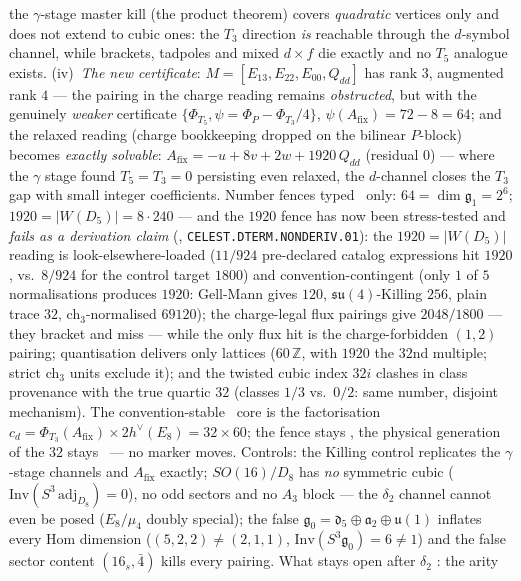 \documentclass[11pt,a4paper]{article}
\newcommand{\Z}{\mathbb Z}
\begin{document}
\begin{itemize}
\begin{itemize}
the $\gamma$-stage master kill (the product theorem) covers \emph{quadratic} vertices only and
does not extend to cubic ones: the $T_3$ direction \emph{is} reachable through the $d$-symbol
channel, while brackets, tadpoles and mixed $d{\times}f$ die exactly and no $T_5$ analogue
exists. (iv)~\emph{The new certificate}: $M=[E_{13},E_{22},E_{00},Q_{dd}]$ has rank $3$,
augmented rank $4$ --- the pairing in the charge reading remains \emph{obstructed}, but with the
genuinely \emph{weaker} certificate $\{\Phi_{T_5},\psi=\Phi_P-\Phi_{T_3}/4\}$,
$\psi(A_{\mathrm{fix}})=72-8=64$; and the relaxed reading (charge bookkeeping dropped on the
bilinear $P$-block) becomes \emph{exactly solvable}:
$A_{\mathrm{fix}}=-u+8v+2w+1920\,Q_{dd}$ (residual $0$) --- where the $\gamma$ stage found
$T_5=T_3=0$ persisting even relaxed, the $d$-channel closes the $T_3$ gap with small integer
coefficients. Number fences typed \mC\ only: $64=\dim\mathfrak g_1=2^6$;
$1920=|W(D_5)|=8\cdot240$ --- and the $1920$ fence has now been stress-tested and \emph{fails as a
derivation claim} (,
\texttt{CELEST.DTERM.NONDERIV.01}): the $1920=|W(D_5)|$ reading is look-elsewhere-loaded ($11/924$
pre-declared catalog expressions hit $1920$, vs.\ $8/924$ for the control target $1800$) and
convention-contingent (only $1$ of $5$ normalisations produces $1920$: Gell-Mann gives $120$,
$\mathfrak{su}(4)$-Killing $256$, plain trace $32$, ch$_3$-normalised $69120$); the charge-legal
flux pairings give $2048/1800$ --- they bracket and miss --- while the only flux hit is the
charge-forbidden $(1,2)$ pairing; quantisation delivers only lattices ($60\,\Z$, with $1920$ the
$32$nd multiple; strict ch$_3$ units exclude it); and the twisted cubic index $32i$ clashes in
class provenance with the true quartic $32$ (classes $1/3$ vs.\ $0/2$: same number, disjoint
mechanism). The convention-stable \mE\ core is the factorisation
$c_d=\Phi_{T_3}(A_{\mathrm{fix}})\times2h^\vee(E_8)=32\times60$; the fence stays \mC, the physical
generation of the $32$ stays \mO\ --- no marker moves.
Controls: the Killing control replicates the $\gamma$-stage channels
and $A_{\mathrm{fix}}$ exactly; $SO(16)/D_8$ has \emph{no} symmetric cubic
($\mathrm{Inv}(S^3\,\mathrm{adj}_{D_8})=0$), no odd sectors and no $A_3$ block --- the $\delta_2$
channel cannot even be posed ($E_8/\mu_4$ doubly special); the false
$\mathfrak g_0=\mathfrak d_5{\oplus}\mathfrak a_2{\oplus}\mathfrak u(1)$ inflates every Hom
dimension ($(5,2,2)\neq(2,1,1)$, $\mathrm{Inv}(S^3\mathfrak g_0)=6\neq1$) and the false sector
content $(16_s,\bar4)$ kills every pairing. What stays open after $\delta_2$ \mO: the arity

\end{itemize}
\end{itemize}
\end{document}

